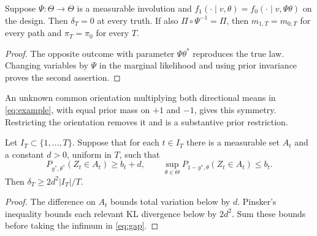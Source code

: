 \begin{proposition}
\label{prop:symmetry}
Suppose $\Psi:\Theta\to\Theta$ is a measurable involution and $f_1(\cdot\mid v,\theta)=f_0(\cdot\mid v,\Psi\theta)$ on the design. Then $\delta_T=0$ at every truth. If also $\Pi\circ\Psi^{-1}=\Pi$, then $m_{1,T}=m_{0,T}$ for every path and $\pi_T=\pi_0$ for every $T$.
\end{proposition}
\begin{proof}
The opposite outcome with parameter $\Psi\theta^*$ reproduces the true law. Changing variables by $\Psi$ in the marginal likelihood and using prior invariance proves the second assertion.
\end{proof}
An unknown common orientation multiplying both directional means in \eqref{eq:example}, with equal prior mass on $+1$ and $-1$, gives this symmetry. Restricting the orientation removes it and is a substantive prior restriction.

\begin{proposition}
\label{prop:sign}
Let $I_T\subset\{1,\ldots,T\}$. Suppose that for each $t\in I_T$ there is a measurable set $A_t$ and a constant $d>0$, uniform in $T$, such that
\[
 P_{y^*,\theta^*}(Z_t\in A_t)\geq b_t+d,\qquad
 \sup_{\theta\in\Theta}P_{1-y^*,\theta}(Z_t\in A_t)\leq b_t.
\]
Then $\delta_T\geq 2d^2|I_T|/T$.
\end{proposition}
\begin{proof}
The difference on $A_t$ bounds total variation below by $d$. Pinsker's inequality bounds each relevant KL divergence below by $2d^2$. Sum these bounds before taking the infimum in \eqref{eq:gap}.
\end{proof}

